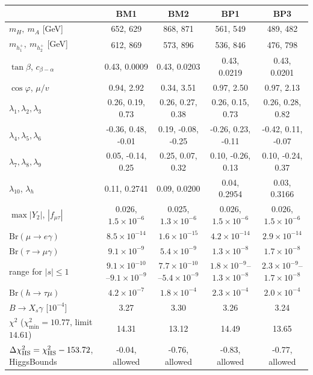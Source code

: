 \documentclass[twocolumn,epjc3]{svjour3}
\newcommand{\Br}{\mathrm{Br}}
\begin{document}
\begin{table}[t]\centering\scriptsize\setlength{\tabcolsep}{2.5pt}
\begin{tabular}{p{5.0cm}cccc}\toprule
 & BM1 & BM2 & BP1 & BP3\\\midrule
$m_H,\ m_A$ [GeV] & 652, 629 & 868, 871 & 561, 549 & 489, 482\\
$m_{h_1^+},\ m_{h_2^+}$ [GeV] & 612, 869 & 573, 896 & 536, 846 & 476, 798\\
$\tan\beta$, $c_{\beta-\alpha}$ & 0.43, 0.0009 & 0.43, 0.0203 & 0.43, 0.0219 & 0.43, 0.0201\\
$\cos\varphi$, $\mu/v$ & 0.94, 2.92 & 0.34, 3.51 & 0.97, 2.50 & 0.97, 2.13\\
$\lambda_1,\lambda_2,\lambda_3$ & 0.26, 0.19, 0.73 & 0.26, 0.27, 0.38 & 0.26, 0.15, 0.73 & 0.26, 0.28, 0.82\\
$\lambda_4,\lambda_5,\lambda_6$ & -0.36, 0.48, -0.01 & 0.19, -0.08, -0.25 & -0.26, 0.23, -0.11 & -0.42, 0.11, -0.07\\
$\lambda_7,\lambda_8,\lambda_9$ & 0.05, -0.14, 0.25 & 0.25, 0.07, 0.32 & 0.10, -0.26, 0.13 & 0.10, -0.24, 0.37\\
$\lambda_{10}$, $\lambda_h$ & 0.11, 0.2741 & 0.09, 0.0200 & 0.04, 0.2954 & 0.03, 0.3166\\
$\max|Y_2|$, $|f_{\mu\tau}|$ & 0.026, $1.5\times10^{-6}$ & 0.025, $1.3\times10^{-6}$ & 0.026, $1.5\times10^{-6}$ & 0.026, $1.5\times10^{-6}$\\
\midrule
$\Br(\mu\to e\gamma)$ & $8.5\times10^{-14}$ & $1.6\times10^{-15}$ & $4.2\times10^{-14}$ & $2.9\times10^{-14}$\\
$\Br(\tau\to\mu\gamma)$ & $9.1\times10^{-9}$ & $5.4\times10^{-9}$ & $1.3\times10^{-8}$ & $1.7\times10^{-8}$\\
\quad range for $|s|\le1$ & $9.1\times10^{-10}$--$9.1\times10^{-9}$ & $7.7\times10^{-10}$--$5.4\times10^{-9}$ & $1.8\times10^{-9}$--$1.3\times10^{-8}$ & $2.3\times10^{-9}$--$1.7\times10^{-8}$\\
$\Br(h\to\tau\mu)$ & $4.2\times10^{-7}$ & $1.8\times10^{-4}$ & $2.3\times10^{-4}$ & $2.0\times10^{-4}$\\
$B\to X_s\gamma$ [$10^{-4}$] & 3.27 & 3.30 & 3.26 & 3.24\\
$\chi^2$ ($\chi^2_{\min}=10.77$, limit $14.61$) & 14.31 & 13.12 & 14.49 & 13.65\\
$\Delta\chi^2_{\rm HS}=\chi^2_{\rm HS}-153.72$, HiggsBounds & -0.04, allowed & -0.76, allowed & -0.83, allowed & -0.77, allowed\\

\end{tabular}
\end{table}
\end{document}
